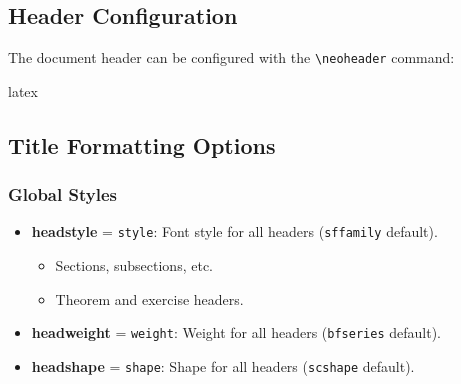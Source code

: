 \documentclass[
    margin=2cm
]{neoschool}
\begin{document}
\subsection{Header Configuration}

The document header can be configured with the
\texttt{\textbackslash neoheader} command:

\begin{code}{latex}
\end{code}

\subsection{Title Formatting Options}

\subsubsection{Global Styles}

\begin{itemize}
\item
  \textbf{headstyle} = \texttt{style}: Font style for
  all headers (\texttt{sffamily} default).

  \begin{itemize}
    \item
    Sections, subsections, etc.
  \item
    Theorem and exercise headers.
  \end{itemize}
\end{itemize}


\begin{itemize}
\item
  \textbf{headweight} = \texttt{weight}: Weight for all
  headers (\texttt{bfseries} default).
\end{itemize}


\begin{itemize}
\item
  \textbf{headshape} = \texttt{shape}: Shape for all
  headers (\texttt{scshape} default).
\end{itemize}
\end{document}

